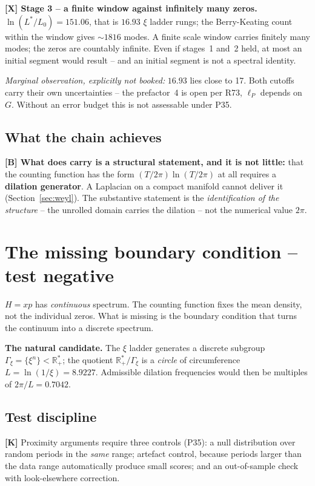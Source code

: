 \textbf{[X] Stage 3 -- a finite window against infinitely many zeros.}
$\ln(L^*/L_0) = 151.06$, that is $16.93$ $\xi$ ladder rungs; the
Berry-Keating count within the window gives ${\sim}1816$ modes. A finite
scale window carries finitely many modes; the zeros are countably
infinite. Even if stages~1 and~2 held, at most an initial segment would
result -- and an initial segment is not a spectral identity.

\emph{Marginal observation, explicitly not booked:} $16.93$ lies close
to 17. Both cutoffs carry their own uncertainties -- the prefactor~4 is
open per R73, $\ell_P$ depends on $G$. Without an error budget this is
not assessable under P35.

\subsection{What the chain achieves}

\textbf{[B] What does carry is a structural statement, and it is not
little:} that
the counting function has the form $(T/2\pi)\ln(T/2\pi)$ at all requires
a \textbf{dilation generator}. A Laplacian on a compact manifold cannot
deliver it (Section~\ref{sec:weyl}). The substantive statement is the
\emph{identification of the structure} -- the unrolled domain carries
the dilation -- not the numerical value $2\pi$.

\section{The missing boundary condition -- test negative}
\label{sec:rand}

$H = xp$ has \emph{continuous} spectrum. The counting function fixes the
mean density, not the individual zeros. What is missing is the boundary
condition that turns the continuum into a discrete spectrum.

\textbf{The natural candidate.} The $\xi$ ladder generates a discrete
subgroup $\Gamma_\xi = \{\xi^n\} < \mathbb{R}_+^*$; the quotient
$\mathbb{R}_+^*/\Gamma_\xi$ is a \emph{circle} of circumference
$L = \ln(1/\xi) = 8.9227$. Admissible dilation frequencies would then be
multiples of $2\pi/L = 0.7042$.

\subsection{Test discipline}

\textbf{[K]} Proximity arguments require three controls (P35): a null
distribution over random periods in the \emph{same} range; artefact
control, because periods larger than the data range automatically
produce small scores; and an out-of-sample check with look-elsewhere
correction.

